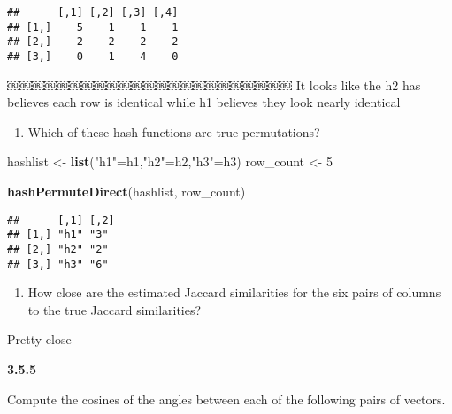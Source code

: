 \documentclass[]{article}
\newenvironment{Shaded}{\begin{snugshade}}{\end{snugshade}}
\newcommand{\KeywordTok}[1]{\textcolor[rgb]{0.13,0.29,0.53}{\textbf{{#1}}}}
\newcommand{\DataTypeTok}[1]{\textcolor[rgb]{0.13,0.29,0.53}{{#1}}}
\newcommand{\DecValTok}[1]{\textcolor[rgb]{0.00,0.00,0.81}{{#1}}}
\newcommand{\StringTok}[1]{\textcolor[rgb]{0.31,0.60,0.02}{{#1}}}
\newcommand{\NormalTok}[1]{{#1}}
\begin{document}
\begin{verbatim}
##      [,1] [,2] [,3] [,4]
## [1,]    5    1    1    1
## [2,]    2    2    2    2
## [3,]    0    1    4    0
\end{verbatim}

￼￼￼￼￼￼￼￼￼￼￼￼￼￼￼￼￼￼￼￼￼￼￼ It looks like the h2 has believes each row is
identical while h1 believes they look nearly identical

\begin{enumerate}
\def\labelenumi{(\alph{enumi})}
\setcounter{enumi}{1}
\itemsep1pt\parskip0pt
\item
  Which of these hash functions are true permutations?
\end{enumerate}

\begin{Shaded}
\begin{Highlighting}[]
\NormalTok{hashlist <-}\StringTok{ }\KeywordTok{list}\NormalTok{(}\StringTok{"h1"}\NormalTok{=h1,}\StringTok{"h2"}\NormalTok{=h2,}\StringTok{"h3"}\NormalTok{=h3)}
\NormalTok{row_count <-}\StringTok{ }\DecValTok{5}

\KeywordTok{hashPermuteDirect}\NormalTok{(hashlist, row_count)}
\end{Highlighting}
\end{Shaded}

\begin{verbatim}
##      [,1] [,2]
## [1,] "h1" "3" 
## [2,] "h2" "2" 
## [3,] "h3" "6"
\end{verbatim}

\begin{enumerate}
\def\labelenumi{(\alph{enumi})}
\setcounter{enumi}{2}
\itemsep1pt\parskip0pt
\item
  How close are the estimated Jaccard similarities for the six pairs of
  columns to the true Jaccard similarities?
\end{enumerate}

Pretty close

\textbf{3.5.5}

Compute the cosines of the angles between each of the following pairs of
vectors.

\begin{Shaded}
\end{Shaded}
\end{document}
